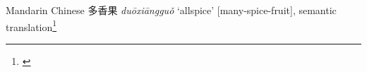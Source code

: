 \begin{etymology}\label{ety:duoxiangguo}
Mandarin Chinese {多香果} \textit{duōxiāngguǒ} `allspice' [many-spice-fruit], semantic translation\footnote{\textcite{mdbg}}
\end{etymology}